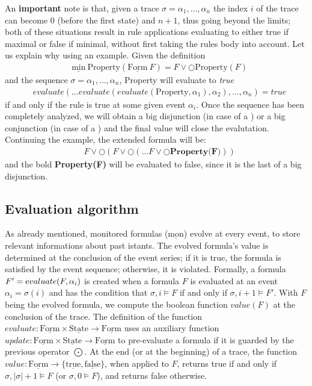 \documentclass[english]{article}
\begin{document}
An \textbf{important} note is that, given a trace $\sigma=\alpha_{1},\ldots ,\alpha_{n}$ the index $i$ of the trace can become $0$ (before the first state) and $n+1$, thus going beyond the limits; both of these situations result in rule applications evaluating to either true if maximal or false if minimal, without first taking the rules body into account. Let us explain why using an example. Given the definition 
\begin{align*}
    & \underline{\text{min}}\ \text{Property}(\underline{\text{Form}}\ F) =F \lor \bigcirc \text{Property}(F)
\end{align*}
and the sequence $\sigma=\alpha_{1},\ldots ,\alpha_{n}$, Property will evaluate to \textit{true} 
\begin{align*}
    & evaluate(\ldots evaluate(evaluate(\text{Property},\alpha_1),\alpha_2),\ldots,\alpha_n)=true
\end{align*}
if and only if the rule is true at some given event $\alpha_i$. 
Once the sequence has been completely analyzed, we will obtain a big disjunction (in case of a \underline{}) or a big conjunction (in case of a \underline{}) and the final value will close the evalutation. Continuing the example, the extended formula will be:
\begin{align*}
    & F \lor \bigcirc(F \lor \bigcirc(\ldots F \lor \bigcirc \textbf{Property(F)})) 
\end{align*}
and the bold \textbf{Property(F)} will be evaluated to false, since it is the last of a big disjunction.
\subsection{Evaluation algorithm}
As already mentioned, monitored formulas ($\underline{\text{mon}}$) evolve at every event, to store relevant informations about past istants. The evolved formula's value is determined at the conclusion of the event series; if it is true, the formula is satisfied by the event sequence; otherwise, it is violated. Formally, a formula $F' = \text evaluate(F, \alpha_i)$ is created when a formula $F$ is evaluated at an event $\alpha_i = \sigma(i)$ and has the condition that $\sigma, i \models F$ if and only if $\sigma, i+1 \models F'$. With $F$ being the evolved formula, we compute the boolean function $value(F)$ at the conclusion of the trace. The definition of the function $evaluate: \underline{\text{Form}} \times \underline{\text{State}} \to \underline{\text{Form}}$ uses an auxiliary function $update: \underline{\text{Form}} \times \underline{\text{State}} \to \underline{\text{Form}}$ to pre-evaluate a formula if it is guarded by the previous operator $\bigodot$. At the end (or at the beginning) of a trace, the
function $value : \underline{\text{Form}} \rightarrow \{ \underline{\text{true}}, \underline{\text{false}} \}$, when applied to $F$, returns true if and only if $\sigma,|\sigma|+1 \models F$ (or $\sigma,0 \models F$), and returns false otherwise.
\end{document}
